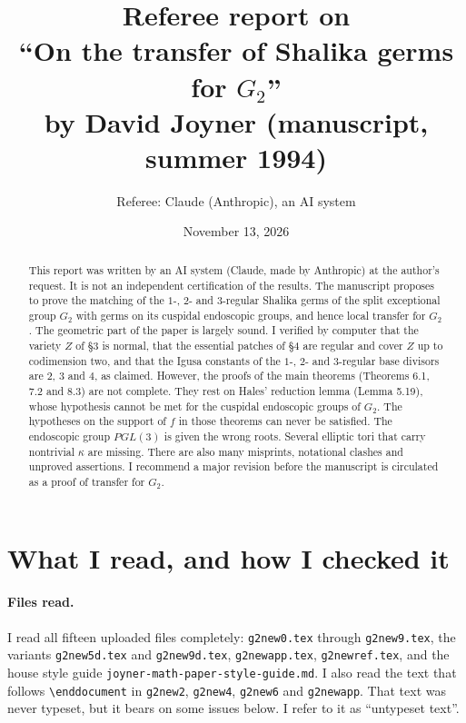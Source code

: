 \documentclass[12pt,letterpaper]{article}
\title{Referee report on\\
``On the transfer of Shalika germs for $G_2$''\\
by David Joyner (manuscript, summer 1994)}
\author{Referee: Claude (Anthropic), an AI system}
\date{November 13, 2026}
\theoremstyle{definition}
\begin{document}
\maketitle

\begin{abstract}
This report was written by an AI system (Claude, made by Anthropic) at the
author's request. It is not an independent certification of the results. The
manuscript proposes to prove the matching of the $1$-, $2$- and $3$-regular
Shalika germs of the split exceptional group $G_2$ with germs on its cuspidal
endoscopic groups, and hence local transfer for $G_2$. The geometric part of the
paper is largely sound. I verified by computer that the variety $Z$ of
\S3 is normal, that the essential patches of \S4 are regular and cover $Z$ up
to codimension two, and that the Igusa constants of the $1$-, $2$- and
$3$-regular base divisors are $2$, $3$ and $4$, as claimed. However, the proofs
of the main theorems (Theorems 6.1, 7.2 and 8.3) are not complete. They rest on
Hales' reduction lemma (Lemma 5.19), whose hypothesis cannot be met for the
cuspidal endoscopic groups of $G_2$. The hypotheses on the support of $f$ in
those theorems can never be satisfied. The endoscopic group $PGL(3)$ is given
the wrong roots. Several elliptic tori that carry nontrivial $\kappa$ are
missing. There are also many misprints, notational clashes and unproved
assertions. I recommend a major revision before the manuscript is circulated
as a proof of transfer for $G_2$.
\end{abstract}

\tableofcontents

\section{What I read, and how I checked it}

\paragraph{Files read.} I read all fifteen uploaded files completely:
\texttt{g2new0.tex} through \texttt{g2new9.tex}, the variants
\texttt{g2new5d.tex} and \texttt{g2new9d.tex}, \texttt{g2newapp.tex},
\texttt{g2newref.tex}, and the house style guide
\texttt{joyner-math-paper-style-guide.md}. I also read the text that follows
\verb|\enddocument| in \texttt{g2new2}, \texttt{g2new4}, \texttt{g2new6} and
\texttt{g2newapp}. That text was never typeset, but it bears on some issues
below. I refer to it as ``untypeset text''.
\end{document}

